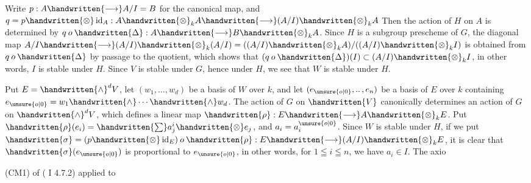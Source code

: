 Write $p:A\handwritten{\longrightarrow}A/I=B$ for the canonical map, and $q=p\handwritten{\otimes}\operatorname{id}_A:A\handwritten{\otimes}_k A\handwritten{\longrightarrow}(A/I)\handwritten{\otimes}_k A$ Then the action of $H$ on $A$ is determined by $q\mathbin{o}\handwritten{\Delta}:A\handwritten{\longrightarrow}B\handwritten{\otimes}_k A$. Since $H$ is a subgroup prescheme of $G$, the diagonal map $A/I\handwritten{\longrightarrow}(A/I)\handwritten{\otimes}_k(A/I)=((A/I)\handwritten{\otimes}_k A)/((A/I)\handwritten{\otimes}_k I)$ is obtained from $q\mathbin{o}\handwritten{\Delta}$ by passage to the quotient, which shows that $(q\mathbin{o}\handwritten{\Delta})(I)\subset(A/I)\handwritten{\otimes}_k I$, in other \linebreak words, $I$ is stable under $H$. Since $V$ is stable under $G$, hence under $H$, we see that $W$ is stable under $H$.

Put $E=\handwritten{\wedge}^d V$, let $(w_1,\ldots,w_d)$ be a basis of $W$ over $k$, and let $(e_{\unsure{o|0}},\mathinner{..},e_n)$ be a basis of $E$ over $k$ containing $e_{\unsure{o|0}}=w_1\handwritten{\wedge}\cdots\handwritten{\wedge}w_d$. The action of $G$ on $\handwritten{V}$ canonically determines an action of $G$ on $\handwritten{\wedge}^d V$, which defines a linear map $\handwritten{\rho}:E\handwritten{\longrightarrow}A\handwritten{\otimes}_k E$. Put $\handwritten{\rho}(e_i)=\handwritten{\sum}a_j^i\handwritten{\otimes}e_j$, and $a_i=a_i^{\unsure{o|0}}$. Since $W$ is stable under $H$, if we put $\handwritten{\sigma}=(p\handwritten{\otimes}\operatorname{id}_E)\mathbin{o}\handwritten{\rho}:E\handwritten{\longrightarrow}(A/I)\handwritten{\otimes}_k E$, it is clear that $\handwritten{\sigma}(e_{\unsure{o|0}})$ is proportional to $e_{\unsure{o|0}}$, in other words, for $1\leqq i\leqq n$, we have $a_i\in I$. The axio (CM1) of ( I 4.7.2) applied to

